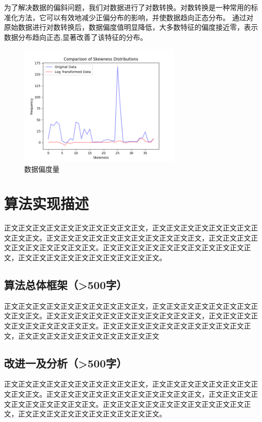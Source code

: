 \documentclass{article}
\begin{document}
为了解决数据的偏斜问题，我们对数据进行了对数转换。对数转换是一种常用的标准化方法，它可以有效地减少正偏分布的影响，并使数据趋向正态分布。
通过对原始数据进行对数转换后，数据偏度值明显降低，大多数特征的偏度接近零，表示数据分布趋向正态,显著改善了该特征的分布。
\begin{figure}[H]
  \centering
  \includegraphics[width=0.7\textwidth]{./png/skewness.png}
  \caption{数据偏度量}
  \label{fig:skew}
\end{figure}



\section{算法实现描述}
正文正文正文正文正文正文正文正文正文正文，正文正文正文正文正文正文正文正文正文正文。正文正文正文正文正文正文正文正文正文正文正文，正文正文正文正文正文正文正文正文正文正文。正文正文正文正文正文正文正文正文正文正文正文，正文正文正文正文正文正文正文正文正文正文。

\subsection{算法总体框架（>500字）}
正文正文正文正文正文正文正文正文正文正文，正文正文正文正文正文正文正文正文正文正文。正文正文正文正文正文正文正文正文正文正文正文，正文正文正文正文正文正文正文正文正文正文。正文正文正文正文正文正文正文正文正文正文正文，正文正文正文正文正文正文正文正文正文正文


\subsection{改进一及分析（>500字）}
正文正文正文正文正文正文正文正文正文正文，正文正文正文正文正文正文正文正文正文正文。正文正文正文正文正文正文正文正文正文正文正文，正文正文正文正文正文正文正文正文正文正文。正文正文正文正文正文正文正文正文正文正文正文，正文正文正文正文正文正文正文正文正文正文。
\end{document}
